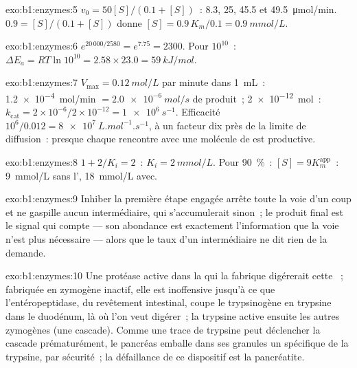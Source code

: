 \begin{solution}{exo:b1:enzymes:5}
$v_0 = 50[S]/(0.1 + [S])$~: 8.3, 25, 45.5 et \qty{49.5}{\micro mol/min}.
$0.9 = [S]/(0.1 + [S])$ donne $[S] = 0.9\,K_m/0.1 = \qty{0.9}{mmol/L}$.
\end{solution}

\begin{solution}{exo:b1:enzymes:6}
$e^{20\,000/2580} = e^{7.75} = 2300$. Pour $10^{10}$~: $\Delta E_a =
RT\ln 10^{10} = 2.58\times 23.0 = \qty{59}{kJ/mol}$.
\end{solution}

\begin{solution}{exo:b1:enzymes:7}
$V_{\max} = \qty{0.12}{mol/L}$ par minute dans \qty{1}{mL}~:
\qty{1.2e-4}{mol/min} $= \qty{2.0e-6}{mol/s}$ de produit~; 
\qty{2e-12}{mol}~: $k_{\text{cat}} = 2\times 10^{-6}/2\times 10^{-12} =
\qty{1e6}{s^{-1}}$. Efficacité $10^6/0.012 = \qty{8e7}{L.mol^{-1}.s^{-1}}$,
à un facteur dix près de la limite de diffusion~: presque chaque
rencontre avec une molécule de  est productive.
\end{solution}

\begin{solution}{exo:b1:enzymes:8}
$1 + 2/K_i = 2$~: $K_i = \qty{2}{mmol/L}$. Pour \qty{90}{\%}~:
$[S] = 9K_m^{\text{app}}$~: \qty{9}{mmol/L} sans l',
\qty{18}{mmol/L} avec.
\end{solution}

\begin{solution}{exo:b1:enzymes:9}
Inhiber la première étape engagée arrête toute la voie d'un coup et ne
gaspille aucun intermédiaire, qui s'accumulerait sinon~; le produit
final est le signal qui compte --- son abondance est exactement
l'information que la voie n'est plus nécessaire --- alors que le taux
d'un intermédiaire ne dit rien de la demande.
\end{solution}

\begin{solution}{exo:b1:enzymes:10}
Une protéase active dans la  qui la fabrique digérerait cette
~; fabriquée en zymogène inactif, elle est inoffensive jusqu'à
ce que l'entéropeptidase,  du revêtement intestinal, coupe le
trypsinogène en trypsine dans le duodénum, là où l'on veut digérer~; la
trypsine active ensuite les autres zymogènes (une cascade). Comme une
trace de trypsine peut déclencher la cascade prématurément, le pancréas
emballe dans ses granules un  spécifique de la trypsine, par
sécurité~; la défaillance de ce dispositif est la pancréatite.
\end{solution}

